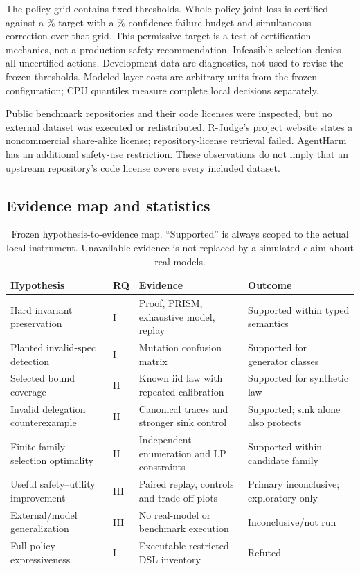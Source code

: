 ﻿\documentclass[lettersize,journal]{IEEEtran}
\begin{document}
The policy grid contains \resThresholdCount{} fixed thresholds. Whole-policy
joint loss is certified against a \resRiskBudget{}\% target with a
\resConfidenceFailure{}\% confidence-failure budget and simultaneous correction
over that grid. This permissive target is a test of certification mechanics,
not a production safety recommendation. Infeasible selection denies all
uncertified actions. Development data are diagnostics, not used to revise the
frozen thresholds. Modeled layer costs are arbitrary units from the frozen
configuration; CPU quantiles measure complete local decisions separately.

Public benchmark repositories and their code licenses were inspected, but no
external dataset was executed or redistributed. R-Judge's project website
states a noncommercial share-alike license; repository-license retrieval failed.
AgentHarm has an additional safety-use restriction. These observations do not
imply that an upstream repository's code license covers every included dataset.

\subsection{Evidence map and statistics}
\begin{table}[t]
\caption{Frozen hypothesis-to-evidence map. ``Supported'' is always scoped to
the actual local instrument. Unavailable evidence is not replaced by a simulated
claim about real models.}
\label{tab:hypotheses}
\centering\small
\begin{tabular}{llll}
\hline
Hypothesis & RQ & Evidence & Outcome\\
\hline
Hard invariant preservation & I & Proof, PRISM, exhaustive model, replay & Supported within typed semantics\\
Planted invalid-spec detection & I & Mutation confusion matrix & Supported for generator classes\\
Selected bound coverage & II & Known iid law with repeated calibration & Supported for synthetic law\\
Invalid delegation counterexample & II & Canonical traces and stronger sink control & Supported; sink alone also protects\\
Finite-family selection optimality & II & Independent enumeration and LP constraints & Supported within candidate family\\
Useful safety--utility improvement & III & Paired replay, controls and trade-off plots & Primary inconclusive; exploratory only\\
External/model generalization & III & No real-model or benchmark execution & Inconclusive/not run\\
Full policy expressiveness & I & Executable restricted-DSL inventory & Refuted\\
\hline
\end{tabular}
\end{table}
\end{document}
